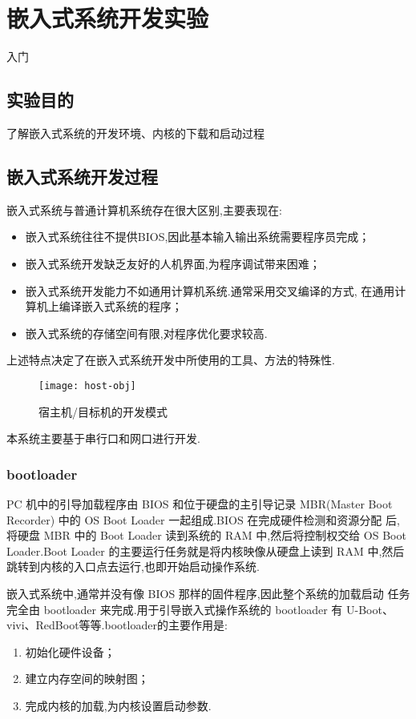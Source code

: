 \chapter{嵌入式系统开发实验}{入门}\label{ch-env}

\section{实验目的}
    了解嵌入式系统的开发环境、内核的下载和启动过程

\section{嵌入式系统开发过程}
    嵌入式系统与普通计算机系统存在很大区别,主要表现在:
\begin{itemize}\itemsep=-3pt
  \item 嵌入式系统往往不提供BIOS,因此基本输入输出系统需要程序员完成；
  \item 嵌入式系统开发缺乏友好的人机界面,为程序调试带来困难；
  \item 嵌入式系统开发能力不如通用计算机系统.通常采用交叉编译的方式,
        在通用计算机上编译嵌入式系统的程序；
  \item 嵌入式系统的存储空间有限,对程序优化要求较高.
\end{itemize}
    上述特点决定了在嵌入式系统开发中所使用的工具、方法的特殊性.

\begin{figure}[!h]
\centering
  \texttt{[image: host-obj]}
\caption{宿主机/目标机的开发模式}
\end{figure}

    本系统主要基于串行口和网口进行开发.

\subsection{bootloader}
	PC 机中的引导加载程序由 BIOS 和位于硬盘的主引导记录 MBR(Master Boot
Recorder) 中的 OS Boot Loader 一起组成.BIOS 在完成硬件检测和资源分配
后,将硬盘 MBR 中的 Boot Loader 读到系统的 RAM 中,然后将控制权交给
OS Boot Loader.Boot Loader 的主要运行任务就是将内核映像从硬盘上读到
RAM 中,然后跳转到内核的入口点去运行,也即开始启动操作系统.

	嵌入式系统中,通常并没有像 BIOS 那样的固件程序,因此整个系统的加载启动
任务完全由 bootloader 来完成.用于引导嵌入式操作系统的 bootloader 有
U-Boot、vivi、RedBoot等等.bootloader的主要作用是:
\begin{enumerate}\itemsep=-3pt
  \item 初始化硬件设备；
  \item 建立内存空间的映射图；
  \item 完成内核的加载,为内核设置启动参数.
\end{enumerate}

